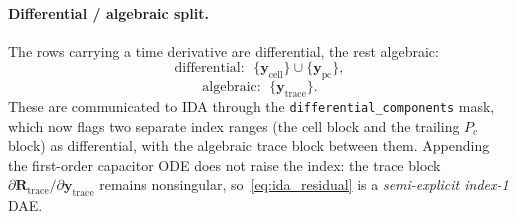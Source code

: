 \documentclass[11pt]{article}
\begin{document}
\paragraph{Differential / algebraic split.}
The rows carrying a time derivative are differential, the rest algebraic:
\begin{equation}
  \text{differential: }\;
  \{\mathbf y_{\mathrm{cell}}\}\cup\{\mathbf y_{\mathrm{pc}}\},
  \label{eq:ida_diff}
\end{equation}
\begin{equation}
  \text{algebraic: }\;
  \{\mathbf y_{\mathrm{trace}}\}.
  \label{eq:ida_alg}
\end{equation}
These are communicated to IDA through the \texttt{differential\_components}
mask, which now flags two separate index ranges (the cell block and the trailing
$P_c$ block) as differential, with the algebraic trace block between them.
Appending the first-order capacitor ODE does not raise the index: the trace
block $\partial\mathbf R_{\mathrm{trace}}/\partial\mathbf y_{\mathrm{trace}}$
remains nonsingular, so~\eqref{eq:ida_residual} is a \emph{semi-explicit
index-1} DAE.
\end{document}
